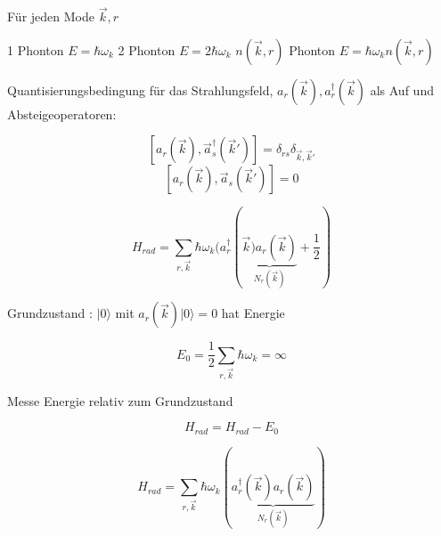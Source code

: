 Für jeden Mode \(\vec k, r\)

1 Phonton \(E= \hbar\omega_k\)
2 Phonton \(E= 2\hbar\omega_k\)
\(n(\vec k,r)\) Phonton \(E= \hbar\omega_k n(\vec k,r)\)


Quantisierungsbedingung für das Strahlungsfeld, \(a_r(\vec k) , a^\dagger_r(\vec k)\) als Auf und Absteigeoperatoren:

\[[a_r(\vec k), \vec a^\dagger_s(\vec k')] = \delta_{rs}\delta_{\vec k,\vec k'}\]
\[[a_r(\vec k), \vec a_s(\vec k')] = 0\]

\[H_{rad} = \sum_{r,\vec k} \hbar\omega_k(a_r^\dagger (\underbrace{\vec k)a_r(\vec k)}_{N_r(\vec k)} +\frac{1}{2})\]

Grundzustand : \(|0\rangle \) mit \(a_r(\vec k) |0\rangle  = 0\) hat Energie

\[ E_0 = \frac{1}{2} \sum_{r,\vec k}\hbar\omega_k = \infty\]

Messe Energie relativ zum Grundzustand 

\[H_{rad} = H_{rad}-E_0\]

\[\boxed{H_{rad} = \sum_{r,\vec k} \hbar\omega_k(\underbrace{a_r^\dagger (\vec k)a_r(\vec k)}_{N_r(\vec k)}) } \]

